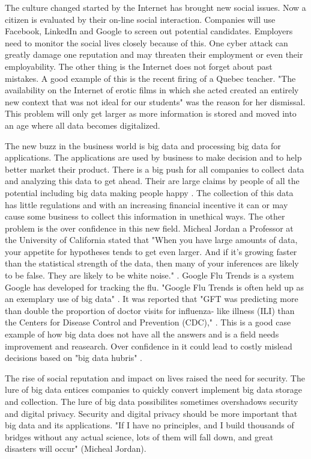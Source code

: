 \documentclass[12pt]{article}
\begin{document}
The culture changed started by the Internet has brought new social issues. Now a citizen is evaluated by their on-line social interaction. Companies will use Facebook, LinkedIn and Google to screen out potential candidates. Employers need to monitor the social lives closely because of this. One cyber attack can greatly damage one reputation and may threaten their employment or even their employability. The other thing is the Internet does not forget about past mistakes. A good example of this is the recent firing of a Quebec teacher. "The availability on the Internet of erotic films in which she acted created an entirely new context that was not ideal for our students" \cite{Peritz} was the reason for her dismissal. This problem will only get larger as more information is stored and moved into an age where all data becomes digitalized.

The new buzz in the business world is big data and processing big data for applications. The applications are used by business to make decision and to help better market their product. There is a big push for all companies to collect data and analyzing this data to get ahead. Their are large claims by people of all the potential including big data making people happy \cite{Banayan}. The collection of this data has little regulations and with an increasing financial incentive it can or may cause some business to collect this information in unethical ways. The other problem is the over confidence in this new field. Micheal Jordan a Professor at the University of California stated that "When you have large amounts of data, your appetite for hypotheses tends to get even larger. And if it’s growing faster than the statistical strength of the data, then many of your inferences are likely to be false. They are likely to be white noise." \cite{Gomes}. Google Flu Trends is a system Google has developed for tracking the flu. "Google Flu Trends is often held 
up as an exemplary use of big data" \cite{Lazer}. It was reported that "GFT was predicting more than double the proportion of doctor visits for influenza- like illness (ILI) than the Centers for Disease Control and Prevention (CDC)," \cite{Lazer}. This is a good case example of how big data does not have all the answers and is a field needs improvement and reasearch. Over confidence in it could lead to costly mislead decisions based on "big data hubris" \cite{Lazer}.

The rise of social reputation and impact on lives raised the need for security. The lure of big data entices companies to quickly convert implement big data storage and collection. The lure of big data possibilites sometimes overshadows security and digital privacy. Security and digital privacy should be more important that big data and its applications. "If I have no principles, and I build thousands of bridges without any actual science, lots of them will fall down, and great disasters will occur" (Micheal Jordan)\cite{Gomes}.
\end{document}
